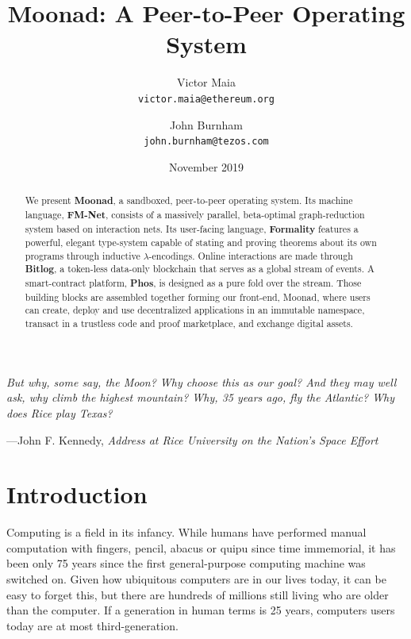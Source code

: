 \documentclass{article}
\theoremstyle{definition}
\theoremstyle{theorem}
\begin{document}
\title{Moonad: A Peer-to-Peer Operating System}
\author{
  Victor Maia\\
  \texttt{victor.maia@ethereum.org}
  \and
  John Burnham\\
  \texttt{john.burnham@tezos.com}
}
\date{November 2019}
\maketitle

\setlength{}
\setlength\epigraphrule{0pt}

\epigraph{\itshape But why, some say, the Moon? Why choose this as our goal? And
they may well ask, why climb the highest mountain? Why, 35 years ago, fly the
Atlantic? Why does Rice play Texas?}{---John F. Kennedy, \textit{Address at
Rice University on the Nation's Space Effort}}

\begin{abstract} We present \textbf{Moonad}, a sandboxed, peer-to-peer
operating system. Its machine language, \textbf{FM-Net}, consists of a
massively parallel, beta-optimal graph-reduction system based on interaction
nets. Its user-facing language, \textbf{Formality} features a powerful, elegant
type-system capable of stating and proving theorems about its own programs
through inductive $\lambda$-encodings. Online interactions are made through
\textbf{Bitlog}, a token-less data-only blockchain that serves as a global
stream of events. A smart-contract platform, \textbf{Phos}, is designed as a
pure fold over the stream. Those building blocks are assembled together forming
our front-end, Moonad, where users can create, deploy and use decentralized
applications in an immutable namespace, transact in a trustless code and proof
marketplace, and exchange digital assets.
\end{abstract}

\newpage
\tableofcontents
\newpage

\section{Introduction} 

Computing is a field in its infancy. While humans have performed manual
computation with fingers, pencil, abacus or quipu since time immemorial, it has
been only 75 years since the first general-purpose computing machine was
switched on. Given how ubiquitous computers are in our lives today, it can be
easy to forget this, but there are hundreds of millions still living who are
older than the computer. If a generation in human terms is 25 years, computers
users today are at most third-generation.
\end{document}

